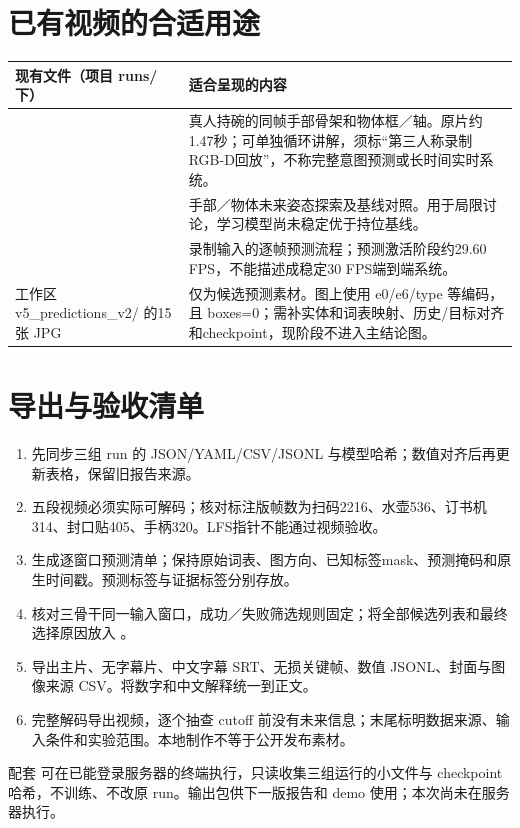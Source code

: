 \documentclass[11pt,a4paper]{ctexart}
\begin{document}
\section{已有视频的合适用途}
\begin{tabularx}{\linewidth}{L{4.8cm}X}
\toprule 现有文件（项目 runs/ 下） & 适合呈现的内容\\\midrule
{} & 真人持碗的同帧手部骨架和物体框／轴。原片约1.47秒；可单独循环讲解，须标“第三人称录制RGB-D回放”，不称完整意图预测或长时间实时系统。\\
 & 手部／物体未来姿态探索及基线对照。用于局限讨论，学习模型尚未稳定优于持位基线。\\
 & 录制输入的逐帧预测流程；预测激活阶段约29.60 FPS，不能描述成稳定30 FPS端到端系统。\\
工作区 v5\_predictions\_v2/ 的15张 JPG & 仅为候选预测素材。图上使用 e0/e6/type 等编码，且 boxes=0；需补实体和词表映射、历史/目标对齐和checkpoint，现阶段不进入主结论图。\\
\bottomrule
\end{tabularx}

\section{导出与验收清单}
\begin{enumerate}
\item 先同步三组 run 的 JSON/YAML/CSV/JSONL 与模型哈希；数值对齐后再更新表格，保留旧报告来源。
\item 五段视频必须实际可解码；核对标注版帧数为扫码2216、水壶536、订书机314、封口贴405、手柄320。LFS指针不能通过视频验收。
\item 生成逐窗口预测清单；保持原始词表、图方向、已知标签mask、预测掩码和原生时间戳。预测标签与证据标签分别存放。
\item 核对三骨干同一输入窗口，成功／失败筛选规则固定；将全部候选列表和最终选择原因放入 。
\item 导出主片、无字幕片、中文字幕 SRT、无损关键帧、数值 JSONL、封面与图像来源 CSV。将数字和中文解释统一到正文。
\item 完整解码导出视频，逐个抽查 cutoff 前没有未来信息；末尾标明数据来源、输入条件和实验范围。本地制作不等于公开发布素材。
\end{enumerate}

配套  可在已能登录服务器的终端执行，只读收集三组运行的小文件与 checkpoint 哈希，不训练、不改原 run。输出包供下一版报告和 demo 使用；本次尚未在服务器执行。
\end{document}
